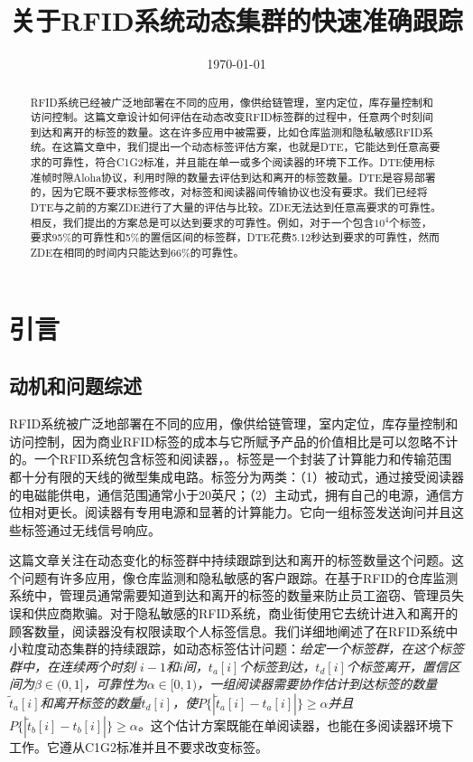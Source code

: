 \documentclass[UTF8]{ctexart}
\title{关于RFID系统动态集群的快速准确跟踪}
\date{\today}
\begin{document}
	\maketitle
	\begin{abstract}
		RFID系统已经被广泛地部署在不同的应用，像供给链管理，室内定位，库存量控制和访问控制。这篇文章设计如何评估在动态改变RFID标签群的过程中，任意两个时刻间到达和离开的标签的数量。这在许多应用中被需要，比如仓库监测和隐私敏感RFID系统。在这篇文章中，我们提出一个动态标签评估方案，也就是DTE，它能达到任意高要求的可靠性，符合C1G2标准，并且能在单一或多个阅读器的环境下工作。DTE使用标准帧时隙Aloha协议，利用时隙的数量去评估到达和离开的标签数量。DTE是容易部署的，因为它既不要求标签修改，对标签和阅读器间传输协议也没有要求。我们已经将DTE与之前的方案ZDE进行了大量的评估与比较。Z\-DE无法达到任意高要求的可靠性。相反，我们提出的方案总是可以达到要求的可靠性。例如，对于一个包含$10^4$个标签，要求95\%的可靠性和5\%的置信区间的标签群，DTE花费5.12秒达到要求的可靠性，然而ZDE在相同的时间内只能达到66\%的可靠性。
	\end{abstract}
	\section{引言}
	\subsection{动机和问题综述}
	RFID系统被广泛地部署在不同的应用，像供给链管理，室内定位，库存量控制和访问控制，因为商业RFID标签的成本与它所赋予产品的价值相比是可以忽略不计的。一个RFID系统包含标签和阅读器，。标签是一个封装了计算能力和传输范围都十分有限的天线的微型集成电路。标签分为两类：（1）被动式，通过接受阅读器的电磁能供电，通信范围通常小于20英尺；（2）主动式，拥有自己的电源，通信方位相对更长。阅读器有专用电源和显著的计算能力。它向一组标签发送询问并且这些标签通过无线信号响应。
	
	这篇文章关注在动态变化的标签群中持续跟踪到达和离开的标签数量这个问题。这个问题有许多应用，像仓库监测和隐私敏感的客户跟踪。在基于RFID的仓库监测系统中，管理员通常需要知道到达和离开的标签的数量来防止员工盗窃、管理员失误和供应商欺骗。对于隐私敏感的RFID系统，商业街使用它去统计进入和离开的顾客数量，阅读器没有权限读取个人标签信息。我们详细地阐述了在RFID系统中小粒度动态集群的持续跟踪，如动态标签估计问题：\emph{给定一个标签群，在这个标签群中，在连续两个时刻 $i-1$和$i$间，$t_a[i]$个标签到达，$t_d[i]$个标签离开，置信区间为$\beta\in(0, 1]$，可靠性为$\alpha\in[0, 1)$，一组阅读器需要协作估计到达标签的数量$\widetilde{t}_a[i]$和离开标签的数量$\widetilde{t}_d[i]$，使$P\{|\widetilde{t}_a[i]-t_a[i]|\}\geq\alpha$并且$P\{|\widetilde{t}_b[i]-t_b[i]|\}\geq\alpha$。}这个估计方案既能在单阅读器，也能在多阅读器环境下工作。它遵从C1G2标准并且不要求改变标签。
	
\end{document}
